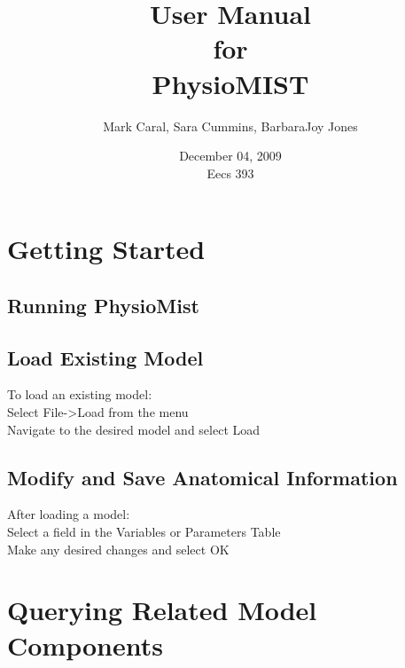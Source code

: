 \documentclass{article}
\title{User Manual\\
\bigskip
{\large for}\\
\bigskip
PhysioMIST}
\author{Mark Caral, Sara Cummins, BarbaraJoy Jones}
\date{December 04, 2009\\{\sc Eecs} 393}
\begin{document}
\begin{titlepage}
\maketitle\thispagestyle{empty}
\end{titlepage}

\newpage

\section{Getting Started}

\subsection{Running PhysioMist}

\subsection{Load Existing Model}

To load an existing model: \\
Select File->Load from the menu \\
Navigate to the desired model and select Load

\subsection{Modify and Save Anatomical Information}

After loading a model: \\
Select a field in the Variables or Parameters Table \\
Make any desired changes and select OK

\section{Querying Related Model Components}
\end{document}
